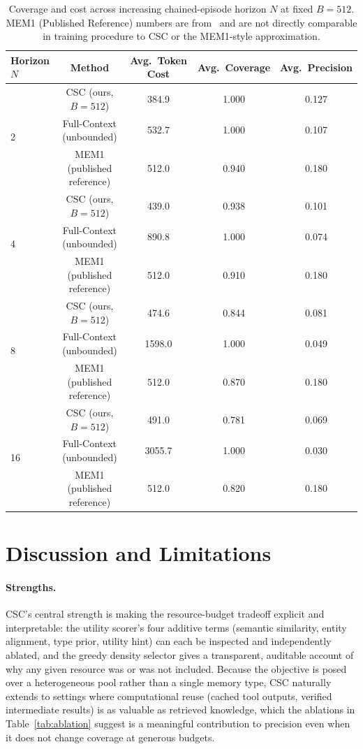 \documentclass{article}
\begin{document}
\begin{table}[t]
\caption{Coverage and cost across increasing chained-episode horizon $N$ at fixed $B=512$. MEM1 (Published Reference) numbers are from~\citet{zhou2025mem1} and are not directly comparable in training procedure to CSC or the MEM1-style approximation.}
\label{tab:mem1-horizon}
\centering
\small
\begin{tabular}{lcccc}
\toprule
Horizon $N$ & Method & Avg.\ Token Cost & Avg.\ Coverage & Avg.\ Precision \\
\midrule
\multirow{3}{*}{2}  & CSC (ours, $B=512$)     & 384.9 & 1.000 & 0.127 \\
                     & Full-Context (unbounded) & 532.7 & 1.000 & 0.107 \\
                     & MEM1 (published reference)     & 512.0 & 0.940 & 0.180 \\
\multirow{3}{*}{4}  & CSC (ours, $B=512$)     & 439.0 & 0.938 & 0.101 \\
                     & Full-Context (unbounded) & 890.8 & 1.000 & 0.074 \\
                     & MEM1 (published reference)     & 512.0 & 0.910 & 0.180 \\
\multirow{3}{*}{8}  & CSC (ours, $B=512$)     & 474.6 & 0.844 & 0.081 \\
                     & Full-Context (unbounded) & 1598.0 & 1.000 & 0.049 \\
                     & MEM1 (published reference)     & 512.0 & 0.870 & 0.180 \\
\multirow{3}{*}{16} & CSC (ours, $B=512$)     & 491.0 & 0.781 & 0.069 \\
                     & Full-Context (unbounded) & 3055.7 & 1.000 & 0.030 \\
                     & MEM1 (published reference)     & 512.0 & 0.820 & 0.180 \\
\bottomrule
\end{tabular}
\end{table}

\section{Discussion and Limitations}
\label{sec:limitations}

\paragraph{Strengths.} CSC's central strength is making the resource-budget tradeoff explicit and interpretable: the utility scorer's four additive terms (semantic similarity, entity alignment, type prior, utility hint) can each be inspected and independently ablated, and the greedy density selector gives a transparent, auditable account of why any given resource was or was not included. Because the objective is posed over a heterogeneous pool rather than a single memory type, CSC naturally extends to settings where computational reuse (cached tool outputs, verified intermediate results) is as valuable as retrieved knowledge, which the ablations in Table~\ref{tab:ablation} suggest is a meaningful contribution to precision even when it does not change coverage at generous budgets.
\end{document}

